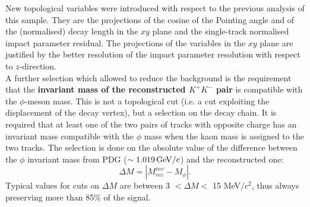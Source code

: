   New topological variables were introduced with respect to the 
  previous analysis of this sample. They are the projections of the cosine of 
the Pointing angle and of the (normalised) decay length in the $xy$ plane 
 and the single-track normalised impact parameter residual.
The projections of the variables in the $xy$ plane are justified by 
the better resolution of the impact parameter resolution with respect to $z$-direction.\\


A further selection which allowed to reduce the background is the requirement that the
 \textbf{invariant mass of the reconstructed $K^+K^-$ pair} is compatible 
 with the $\phi$-meson mass. This is not a topological 
 cut (i.e. a cut exploiting the displacement of the decay vertex), 
 but a selection on the decay chain. It is required that at least 
 one of the two pairs of tracks with opposite charge has an invariant
  mass compatible with the $\phi$ mass when the kaon mass is assigned to
  the two tracks. The selection is done on 
  the absolute value of the difference between the $\phi$ 
   invariant mass from PDG ($\sim 1.019\, \mathrm{GeV}/c$) and the reconstructed one:
\[
\Delta M = |M^{inv}_{rec}-M_{\phi}|.
\]
Typical values for cuts on $\Delta M$ are between 3 $<\Delta M<$ 15 MeV$/c^2$,
thus always preserving more than 85\% of the signal.

